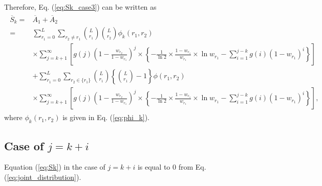 %
Therefore, Eq. (\ref{eq:Sk_case3}) can be written as
\begin{align}\begin{split}
	\overline{S}_k =& \overline{A}_1 + \overline{A}_2 \\
	=& \sum_{r_1=0}^{L} \sum_{r_2 \neq r_1} \binom{L}{r_1}\binom{L}{r_2}\phi_k(r_1,r_2)\\
	&\times\sum_{j=k+1}^{\infty} \left[ g(j) \left(1-\frac{w_{r_2}}{1-w_{r_1}} \right)^{j} \times \left\{ -\frac{1}{\ln 2} \times \frac{1-w_{r_1}}{w_{r_1}} \times \ln w_{r_1} - \sum_{i=1}^{j-k} g(i)(1-w_{r_1})^{i} \right\} \right] \\
	&+\sum_{r_1=0}^{L} \sum_{r_2 \in \{r_1\}} \binom{L}{r_1}\left\{\binom{L}{r_1}-1\right\} \phi(r_1,r_2) \\
	&\times\sum_{j=k+1}^{\infty} \left[ g(j) \left(1-\frac{w_{r_2}}{1-w_{r_1}} \right)^{j} \times \left\{ -\frac{1}{\ln 2} 
	\times \frac{1-w_{r_1}}{w_{r_1}} \times \ln w_{r_1} - \sum_{i=1}^{j-k} g(i)(1-w_{r_1})^{i} \right\} \right],
\end{split}\end{align}
where $\phi_k(r_1,r_2)$ is given in Eq. (\ref{eq:phi_k}).
\subsection{Case of $j=k+i$}
Equation (\ref{eq:Sk}) in the case of $j=k+i$ is equal to $0$ from Eq. (\ref{eq:joint_distribution}).
